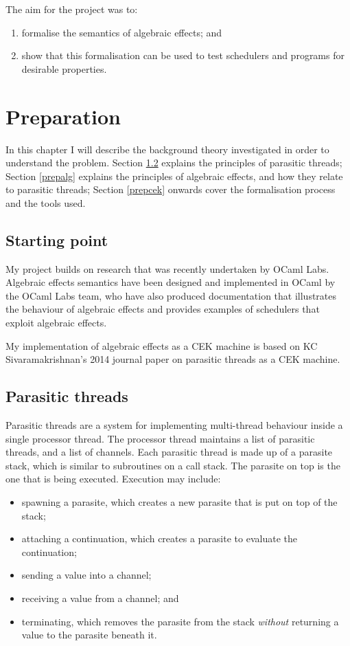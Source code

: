 \documentclass[12pt,a4paper,twoside,openright]{report}
\begin{document}
The aim for the project was to:

\begin{enumerate}[label=(\alph*)]
\item formalise the semantics of algebraic effects; and
\item show that this formalisation can be used to test schedulers and programs for desirable properties.
\end{enumerate}

\chapter{Preparation}

In this chapter I will describe the background theory investigated in order to understand the problem. Section \ref{preppara} explains the principles of parasitic threads; Section \ref{prepalg} explains the principles of algebraic effects, and how they relate to parasitic threads; Section \ref{prepcek} onwards cover the formalisation process and the tools used.

\section{Starting point}\label{prepstart}

My project builds on research that was recently undertaken by OCaml Labs. Algebraic effects semantics have been designed and implemented in OCaml by the OCaml Labs team, who have also produced documentation that illustrates the behaviour of algebraic effects and provides examples of schedulers that exploit algebraic effects.

My implementation of algebraic effects as a CEK machine is based on KC Sivaramakrishnan's 2014 journal paper on parasitic threads as a CEK machine\cite{Siv2014}.

\section{Parasitic threads}\label{preppara}
Parasitic threads are a system for implementing multi-thread behaviour inside a single processor thread. The processor thread maintains a list of parasitic threads, and a list of channels. Each parasitic thread is made up of a parasite stack, which is similar to subroutines on a call stack. The parasite on top is the one that is being executed. Execution may include: 

\begin{itemize}
\item spawning a parasite, which creates a new parasite that is put on top of the stack; 
\item attaching a continuation, which creates a parasite to evaluate the continuation;
\item sending a value into a channel;
\item receiving a value from a channel; and 
\item terminating, which removes the parasite from the stack \textit{without} returning a value to the parasite beneath it.
\end{itemize}
\end{document}
